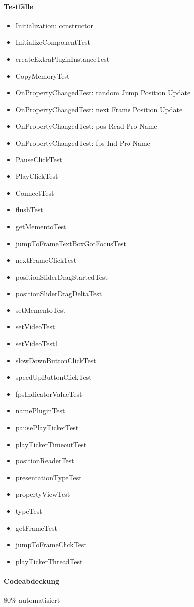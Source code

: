 \paragraph*{Testfälle}
\begin{itemize}
\item Initialization: constructor
\item InitializeComponentTest
\item createExtraPluginInstanceTest
\item CopyMemoryTest
\item OnPropertyChangedTest: random Jump Position Update
\item OnPropertyChangedTest: next Frame Position Update
\item OnPropertyChangedTest: pos Read Pro Name
\item OnPropertyChangedTest: fps Ind Pro Name
\item PauseClickTest
\item PlayClickTest
\item ConnectTest
\item flushTest
\item getMementoTest
\item jumpToFrameTextBoxGotFocusTest
\item nextFrameClickTest
\item positionSliderDragStartedTest
\item positionSliderDragDeltaTest
\item setMementoTest
\item setVideoTest
\item setVideoTest1
\item slowDownButtonClickTest
\item speedUpButtonClickTest
\item fpsIndicatorValueTest
\item namePluginTest
\item pausePlayTickerTest
\item playTickerTimeoutTest
\item positionReaderTest
\item presentationTypeTest
\item propertyViewTest
\item typeTest
\item getFrameTest
\item jumpToFrameClickTest
\item playTickerThreadTest
\end{itemize}

\paragraph*{Codeabdeckung}
80\% automatisiert

